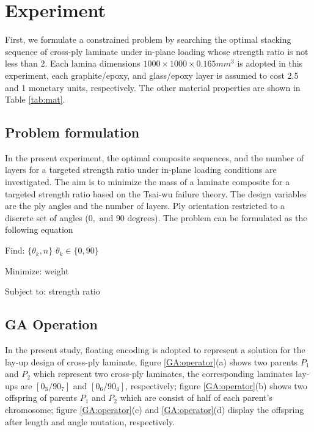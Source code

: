 \section{Experiment}
First, we formulate a constrained problem by searching the optimal stacking
sequence of cross-ply laminate under in-plane loading whose strength ratio is
not less than 2.  Each lamina dimensions $1000 \times 1000 \times 0.165 mm^3$
is adopted in this experiment, each graphite/epoxy,  and glass/epoxy layer is
assumed to cost 2.5 and 1 monetary units, respectively. The other material
properties are shown in Table \ref{tab:mat}. 


\subsection{Problem formulation}

In the present experiment, the optimal composite sequences, and the number of
layers for a targeted strength ratio under in-plane loading conditions are
investigated.  The aim is to minimize the mass of a laminate composite for a
targeted strength ratio based on the Tsai-wu failure theory. The design
variables are the ply angles and the number of layers.  Ply orientation
restricted to a discrete set of angles ($0, \text{ and } 90 \text{ degrees} $).
The problem can be formulated as the following equation

Find: $\{\theta_k, n\}$ $\theta_k \in \{ 0,90\}$

Minimize: weight

Subject to: strength ratio


\subsection{GA Operation}


In the present study, floating encoding is adopted to represent a solution for
the lay-up design of cross-ply laminate, figure \ref{GA:operator}(a) shows two
parents $P_1$ and $P_2$ which represent two cross-ply laminates, the
corresponding laminates lay-ups are $[0_3/90_7]$ and $[0_6/90_4]$,
respectively; figure \ref{GA:operator}(b) shows two offspring of parents $P_1$
and $P_2$ which are consist of half of each parent's chromosome; figure
\ref{GA:operator}(c) and \ref{GA:operator}(d) display the offspring after
length and angle mutation, respectively.

